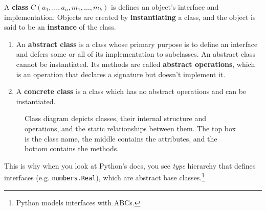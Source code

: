   \begin{definition}[Class]
    A \textbf{class} $C(a_1, \ldots, a_n, m_1, \ldots, m_k)$ is defines an object's interface and implementation. Objects are created by \textbf{instantiating} a class, and the object is said to be an \textbf{instance} of the class. 
    \begin{enumerate}
      \item An \textbf{abstract class} is a class whose primary purpose is to define an interface and defers some or all of its implementation to subclasses. An abstract class cannot be instantiated. Its methods are called \textbf{abstract operations}, which is an operation that declares a signature but doesn't implement it.\footnotemark
      \item A \textbf{concrete class} is a class which has no abstract operations and can be instantiated. 
    \end{enumerate}
    
    \begin{figure}[H]
      \centering 
      {
      }
      \caption{Class diagram depicts classes, their internal structure and operations, and the static relationships between them. The top box is the class name, the middle contains the attributes, and the bottom contains the methods.} 
      \label{fig:class_diagram}
    \end{figure}

  \end{definition}


  This is why when you look at Python's docs, you see \textit{type} hierarchy that defines interfaces (e.g. \texttt{numbers.Real}), which are abstract base classes.\footnote{Python models interfaces with ABCs. }

